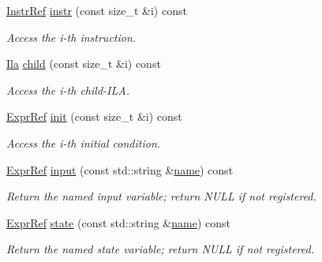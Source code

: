 \begin{DoxyCompactItemize}
\mbox{\hyperlink{classilang_1_1_instr_ref}{Instr\+Ref}} \mbox{\hyperlink{classilang_1_1_ila_aefa0aecd00a104cdcfc25a04a99316cd}{instr}} (const size\+\_\+t \&i) const
\begin{DoxyCompactList}\small\item\em Access the i-\/th instruction. \end{DoxyCompactList}\item 
\mbox{\label{classilang_1_1_ila_a4b2e825a157ab9207dc6d6cd6d13fbdd}} 
\mbox{\hyperlink{classilang_1_1_ila}{Ila}} \mbox{\hyperlink{classilang_1_1_ila_a4b2e825a157ab9207dc6d6cd6d13fbdd}{child}} (const size\+\_\+t \&i) const
\begin{DoxyCompactList}\small\item\em Access the i-\/th child-\/\+I\+LA. \end{DoxyCompactList}\item 
\mbox{\label{classilang_1_1_ila_ac1d991c75fe669b9c39c84ad1820f125}} 
\mbox{\hyperlink{classilang_1_1_expr_ref}{Expr\+Ref}} \mbox{\hyperlink{classilang_1_1_ila_ac1d991c75fe669b9c39c84ad1820f125}{init}} (const size\+\_\+t \&i) const
\begin{DoxyCompactList}\small\item\em Access the i-\/th initial condition. \end{DoxyCompactList}\item 
\mbox{\label{classilang_1_1_ila_aea7ae3e8819b4cab0524eef4b66bf97f}} 
\mbox{\hyperlink{classilang_1_1_expr_ref}{Expr\+Ref}} \mbox{\hyperlink{classilang_1_1_ila_aea7ae3e8819b4cab0524eef4b66bf97f}{input}} (const std\+::string \&\mbox{\hyperlink{classilang_1_1_ila_aef59c0b294a99f65ce5dccef8dd1ccb7}{name}}) const
\begin{DoxyCompactList}\small\item\em Return the named input variable; return N\+U\+LL if not registered. \end{DoxyCompactList}\item 
\mbox{\label{classilang_1_1_ila_af4faf3005888bf8dbfea193c9257d8bf}} 
\mbox{\hyperlink{classilang_1_1_expr_ref}{Expr\+Ref}} \mbox{\hyperlink{classilang_1_1_ila_af4faf3005888bf8dbfea193c9257d8bf}{state}} (const std\+::string \&\mbox{\hyperlink{classilang_1_1_ila_aef59c0b294a99f65ce5dccef8dd1ccb7}{name}}) const
\begin{DoxyCompactList}\small\item\em Return the named state variable; return N\+U\+LL if not registered. \end{DoxyCompactList}\item 

\end{DoxyCompactItemize}
